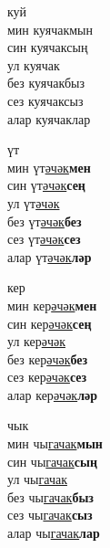 \begin{multicols}{4}
\begin{enumerate}
\begin{minipage}{\linewidth}
    \item
    куй\\
    мин куячакмын\\
    син куячаксың\\
    ул куячак\\
    без куячакбыз\\
    сез куячаксыз\\
    алар куячаклар\\
\end{minipage}

\begin{minipage}{\linewidth}
    \item
    үт\\
    мин үт\underline{әчәк}\textbf{мен}\\
    син үт\underline{әчәк}\textbf{сең}\\
    ул үт\underline{әчәк}\\
    без үт\underline{әчәк}\textbf{без}\\
    сез үт\underline{әчәк}\textbf{сез}\\
    алар үт\underline{әчәк}\textbf{ләр}\\
\end{minipage}

\begin{minipage}{\linewidth}
    \item
    кер\\
    мин кер\underline{әчәк}\textbf{мен}\\
    син кер\underline{әчәк}\textbf{сең}\\
    ул кер\underline{әчәк}\\
    без кер\underline{әчәк}\textbf{без}\\
    сез кер\underline{әчәк}\textbf{сез}\\
    алар кер\underline{әчәк}\textbf{ләр}\\
\end{minipage}

\begin{minipage}{\linewidth}
    \item
    чык\\
    мин чы\underline{гачак}\textbf{мын}\\
    син чы\underline{гачак}\textbf{сың}\\
    ул чы\underline{гачак}\\
    без чы\underline{гачак}\textbf{быз}\\
    сез чы\underline{гачак}\textbf{сыз}\\
    алар чы\underline{гачак}\textbf{лар}\\
\end{minipage}


\end{enumerate}
\end{multicols}
